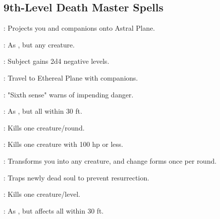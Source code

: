 \begin{multicols}{2}
\subsection{9th-Level Death Master Spells}
\begin{description*}
\item[\linkspell{Astral Projection}:] Projects you and companions onto Astral Plane.
\item[\linkspell{Dominate Monster}:] As , but any creature.
\item[\linkspell{Energy Drain}:] Subject gains 2d4 negative levels.
\item[\linkspell{Etherealness}:] Travel to Ethereal Plane with companions.
\item[\linkspell{Foresight}:] "Sixth sense" warns of impending danger.
\item[\linkspell{Hold Monster, Mass}:] As , but all within 30 ft.
\item[\linkspell{Implosion}:] Kills one creature/round.
\item[\linkspell{Power Word Kill}:] Kills one creature with 100 hp or less.
\item[\linkspell{Shapechange}:] Transforms you into any creature, and change forms once per round.
\item[\linkspell{Soul Bind}:] Traps newly dead soul to prevent resurrection.
\item[\linkspell{Wail of the Banshee}:] Kills one creature/level.
\item[\linkspell{Weird}:] As , but affects all within 30 ft.
\end{description*}

\end{multicols}